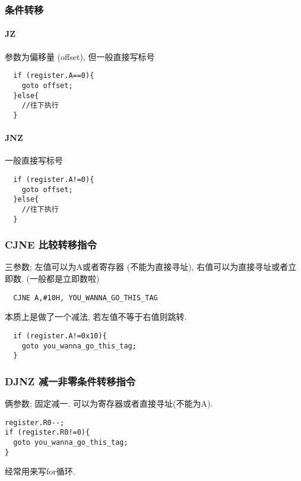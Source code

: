 \documentclass[a4paper]{report}
\begin{document}
\subsubsection{条件转移}
\paragraph{JZ}
参数为偏移量 (offset), 但一般直接写标号
\begin{verbatim}
  if (register.A==0){
    goto offset;
  }else{
    //往下执行
  }
\end{verbatim}

\paragraph{JNZ}一般直接写标号
\begin{verbatim}
  if (register.A!=0){
    goto offset;
  }else{
    //往下执行
  }
\end{verbatim}


\subsubsection{CJNE 比较转移指令}
三参数; 左值可以为A或者寄存器 (不能为直接寻址), 右值可以为直接寻址或者立即数. (一般都是立即数啦)
\begin{verbatim}
  CJNE A,#10H, YOU_WANNA_GO_THIS_TAG
\end{verbatim}
本质上是做了一个减法, 若左值不等于右值则跳转. 
\begin{verbatim}
  if (register.A!=0x10){
    goto you_wanna_go_this_tag;
  }
\end{verbatim}
\subsubsection{DJNZ 减一非零条件转移指令}
俩参数; 固定减一. 可以为寄存器或者直接寻址(不能为A). 
\begin{verbatim}
register.R0--;
if (register.R0!=0){
  goto you_wanna_go_this_tag;
}
\end{verbatim}
经常用来写for循环. 
\end{document}
